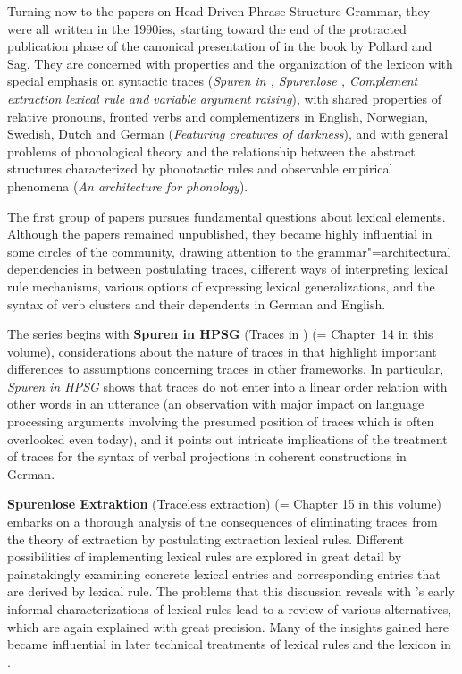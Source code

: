 \begin{refsection}


\medskip
Turning now to the papers on Head-Driven Phrase Structure Grammar, they were all written in
the 1990ies, starting toward the end of the protracted publication phase of the
canonical presentation of  in the book by Pollard and Sag.
They are concerned with properties and the organization of the lexicon
with special emphasis on syntactic traces (\emph{Spuren in ,
Spurenlose , Complement extraction lexical rule and variable
argument raising}), with shared properties of relative pronouns, fronted
verbs and complementizers in English, Norwegian, Swedish, Dutch and
German (\emph{Featuring creatures of darkness}), and with general problems of
phonological theory and the relationship between the abstract
structures characterized by phonotactic rules and observable
empirical phenomena (\emph{An architecture for phonology}).

The first group of papers pursues fundamental questions about lexical
elements. Although the papers remained unpublished, they became highly
influential in some circles of the  community, drawing attention
to the grammar"=architectural dependencies in  between postulating
traces, different ways of interpreting lexical rule
mechanisms, various options of expressing lexical generalizations, and
the syntax of verb clusters and their dependents in German and
English.

The series begins with \textbf{Spuren in HPSG} (Traces in
) (= Chapter~14 in this volume), considerations about the nature of traces in  that
highlight important differences to assumptions concerning traces in other
frameworks. In particular, \emph{Spuren in HPSG} shows that traces do
not enter into a linear order relation with other words in an
utterance (an observation with major impact on
language processing arguments involving the presumed position of
traces which is often overlooked even today), and it points out
intricate implications of the treatment of traces for
the syntax of verbal projections in coherent constructions in
German.

\textbf{Spurenlose Extraktion} (Traceless extraction) (= Chapter 15 in this volume) embarks
on a thorough analysis of the consequences of eliminating traces from
the theory of extraction by postulating extraction lexical rules. Different
possibilities of implementing lexical rules are explored in great
detail by painstakingly examining concrete lexical
entries and corresponding entries that are derived by lexical
rule. The problems that this discussion reveals with 's
early informal characterizations of lexical rules lead to a review of
various alternatives, which are again explained with great
precision. Many of the insights gained here became influential in
later technical treatments of lexical rules and the lexicon in
.


\end{refsection}
